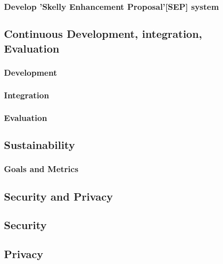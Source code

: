 \documentclass[11pt]{article}
\begin{document}
\subsubsection{Develop 'Skelly Enhancement Proposal'[SEP] system}

\subsection{Continuous Development, integration, Evaluation}
\subsubsection{Development}
\subsubsection{Integration}
\subsubsection{Evaluation}

\subsection{Sustainability}
\subsubsection{Goals and Metrics}

\subsection{Security and Privacy}
\subsection{Security}
\subsection{Privacy}

\newpage
\printbibliography
\end{document}
